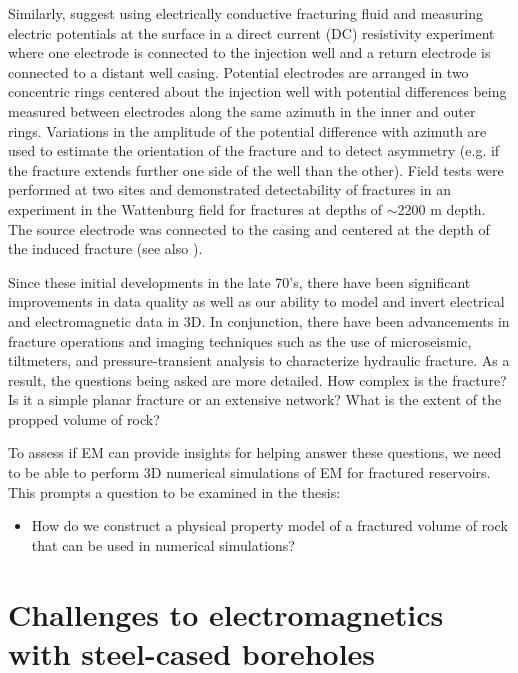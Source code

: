 Similarly, \cite{Bartel1976} suggest using electrically conductive fracturing fluid and measuring electric potentials at the surface in a direct current (DC) resistivity experiment where one electrode is connected to the injection well and a return electrode is connected to a distant well casing. Potential electrodes are arranged in two concentric rings centered about the injection well with potential differences being measured between electrodes along the same azimuth in the inner and outer rings. Variations in the amplitude of the potential difference with azimuth are used to estimate the orientation of the fracture and to detect asymmetry (e.g. if the fracture extends further one side of the well than the other). Field tests were performed at two sites and demonstrated detectability of fractures in an experiment in the Wattenburg field for fractures at depths of $\sim$2200 m depth. The source electrode was connected to the casing and centered at the depth of the induced fracture (see also \cite{Smith1978}).

Since these initial developments in the late 70's, there have been significant improvements in data quality as well as our ability to model and invert electrical and electromagnetic data in 3D. In conjunction, there have been advancements in fracture operations and imaging techniques such as the use of microseismic, tiltmeters, and pressure-transient analysis to characterize hydraulic fracture. As a result, the questions being asked are more detailed. How complex is the fracture? Is it a simple planar fracture or an extensive network? What is the extent of the propped volume of rock?

To assess if EM can provide insights for helping answer these questions, we need to be able to perform 3D numerical simulations of EM for fractured reservoirs. This prompts a question to be examined in the thesis:
\begin{itemize}
\item{How do we construct a physical property model of a fractured volume of rock that can be used in numerical simulations?}
\end{itemize}

\section{Challenges to electromagnetics with steel-cased boreholes}
\label{sec:challenges-steel-casing}

